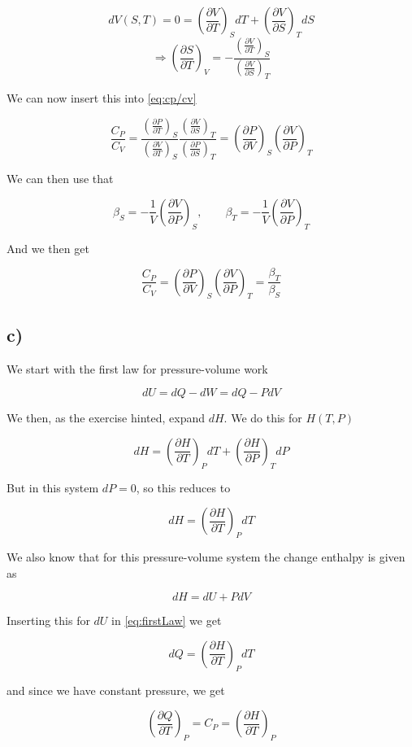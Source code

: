 \documentclass[a4paper,norsk, 10pt]{article}
\newcommand{\pd}[2]{\frac{\partial #1}{\partial #2}}
\begin{document}
\begin{equation}
dV(S,T) = 0 = \left(\pd{V}{T}\right)_S dT + \left(\pd{V}{S}\right)_T dS
\end{equation}
\begin{equation}
\Rightarrow\left(\pd{S}{T}\right)_V = -\frac{\left(\pd{V}{T}\right)_S}{\left(\pd{V}{S}\right)_T}
\end{equation}

We can now insert this into \eqref{eq:cp/cv}

\begin{equation}
\frac{C_P}{C_V} = \frac{\left(\pd{P}{T}\right)_S}{\left(\pd{V}{T}\right)_S}\frac{\left(\pd{V}{S}\right)_T}{\left(\pd{P}{S}\right)_T} =
\left(\pd{P}{V}\right)_S \left(\pd{V}{P}\right)_T
\end{equation}

We can then use that

\begin{equation}
\beta_S = -\frac{1}{V}\left(\pd{V}{P}\right)_S, \qquad \beta_T = -\frac{1}{V}\left(\pd{V}{P}\right)_T
\end{equation}

And we then get

\begin{equation}
\frac{C_P}{C_V} = \left(\pd{P}{V}\right)_S \left(\pd{V}{P}\right)_T = \frac{\beta_T}{\beta_S}
\end{equation}

\subsection{c)}
We start with the first law for pressure-volume work

\begin{equation}
dU = dQ - dW = dQ - PdV
\label{eq:firstLaw}
\end{equation}

We then, as the exercise hinted, expand $dH$. We do this for $H(T,P)$

\begin{equation}
dH = \left(\pd{H}{T}\right)_P dT + \left(\pd{H}{P}\right)_T dP
\end{equation}

But in this system $dP = 0$, so this reduces to

\begin{equation}
dH = \left(\pd{H}{T}\right)_P dT
\end{equation}

We also know that for this pressure-volume system the change enthalpy is given as

\begin{equation}
dH = dU + PdV
\end{equation}

Inserting this for $dU$ in \eqref{eq:firstLaw} we get

\begin{equation}
dQ = \left(\pd{H}{T}\right)_P dT
\end{equation}

and since we have constant pressure, we get

\begin{equation}
\left(\pd{Q}{T}\right)_P = C_P = \left(\pd{H}{T}\right)_P
\end{equation}
\end{document}
